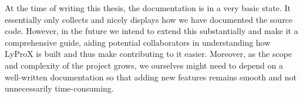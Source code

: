 \documentclass[\relativeRoot/main.tex]{subfiles}
\begin{document}
At the time of writing this thesis, the documentation is in a very basic state. It essentially only collects and nicely displays how we have documented the source code. However, in the future we intend to extend this substantially and make it a comprehensive guide, aiding potential collaborators in understanding how LyProX is built and thus make contributing to it easier. Moreover, as the scope and complexity of the project grows, we ourselves might need to depend on a well-written documentation so that adding new features remains smooth and not unnecessarily time-consuming.
\end{document}
